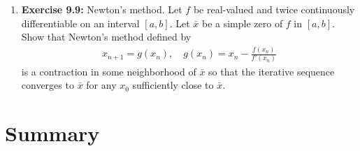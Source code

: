 \documentclass[aspectratio=169,10pt]{beamer}
\begin{document}
\begin{frame}[allowframebreaks]
\begin{enumerate}
    \vspace{0.3cm}

    \item \textbf{Exercise 9.9:} Newton's method. Let $f$ be real-valued and twice
    continuously differentiable on an interval $[a, b]$. Let $\bar{x}$ be a simple
    zero of $f$ in $[a, b]$. Show that Newton's method defined by
    \begin{align*}
    x_{n+1} = g(x_n), \quad g(x_n) = x_n - \frac{f(x_n)}{f'(x_n)}
    \end{align*}
    is a contraction in some neighborhood of $\bar{x}$ so that the iterative
    sequence converges to $\bar{x}$ for any $x_0$ sufficiently close to $\bar{x}$.
\end{enumerate}

\end{frame}

\section{Summary}
\end{document}
